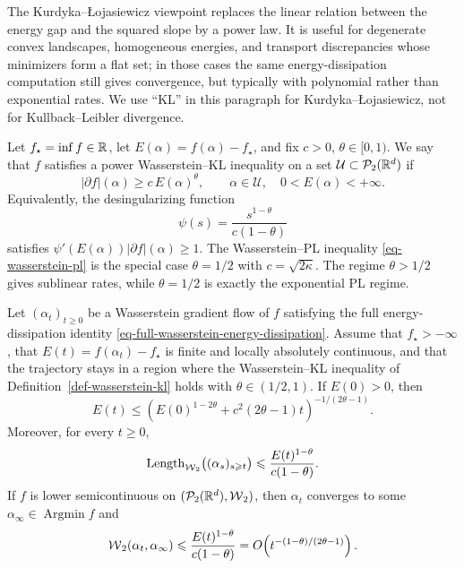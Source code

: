 The Kurdyka--{\L}ojasiewicz viewpoint replaces the linear relation between the energy gap and the squared slope by a power law. It is useful for degenerate convex landscapes, homogeneous energies, and transport discrepancies whose minimizers form a flat set; in those cases the same energy-dissipation computation still gives convergence, but typically with polynomial rather than exponential rates. We use ``KL'' in this paragraph for Kurdyka--{\L}ojasiewicz, not for Kullback--Leibler divergence.

\begin{defn}\label{def-wasserstein-kl}
	Let \(f_\star=\inf f\in\mathbb{R}\), let \(E(\alpha)=f(\alpha)-f_\star\), and fix \(c>0\), \(\theta\in[0,1)\). We say that \(f\) satisfies a power Wasserstein--KL inequality on a set \(\mathcal U\subset \mathcal{P}_2(\mathbb{R}^d)\) if
	\[
		|\partial f|(\alpha)
		\geq
		c\,E(\alpha)^\theta,
		\qquad
		\alpha\in\mathcal U,
		\quad
		0<E(\alpha)<+\infty.
	\]
	Equivalently, the desingularizing function
	\[
		\psi(s)=\frac{s^{1-\theta}}{c(1-\theta)}
	\]
	satisfies \(\psi'(E(\alpha))|\partial f|(\alpha)\geq 1\). The Wasserstein--PL inequality \eqref{eq-wasserstein-pl} is the special case \(\theta=1/2\) with \(c=\sqrt{2\kappa}\). The regime \(\theta>1/2\) gives sublinear rates, while \(\theta=1/2\) is exactly the exponential PL regime.
\end{defn}

\begin{thm}\label{thm-wasserstein-kl-sublinear}
	Let \((\alpha_t)_{t\geq0}\) be a Wasserstein gradient flow of \(f\) satisfying the full energy-dissipation identity \eqref{eq-full-wasserstein-energy-dissipation}. Assume that \(f_\star> -\infty\), that \(E(t)=f(\alpha_t)-f_\star\) is finite and locally absolutely continuous, and that the trajectory stays in a region where the Wasserstein--KL inequality of Definition~\ref{def-wasserstein-kl} holds with \(\theta\in(1/2,1)\). If \(E(0)>0\), then
	\[
		E(t)
		\leq
		\left(E(0)^{1-2\theta}+c^2(2\theta-1)t\right)^{-1/(2\theta-1)}.
	\]
	Moreover, for every \(t\geq0\),
	\[
		\operatorname{Length}_{\operatorname{\mathcal{W}}_2}\bigl((\alpha_s)_{s\geqslant t}\bigr)
		\leqslant
		\frac{E(t)^{1-\theta}}{c(1-\theta)}.
	\]
	If \(f\) is lower semicontinuous on \((\mathcal{P}_2(\mathbb{R}^d),\operatorname{\mathcal{W}}_2)\), then \(\alpha_t\) converges to some \(\alpha_\infty\in\operatorname{Argmin}f\) and
	\[
		\operatorname{\mathcal{W}}_2(\alpha_t,\alpha_\infty)
		\leqslant
		\frac{E(t)^{1-\theta}}{c(1-\theta)}
		=
		O\!\left(t^{-(1-\theta)/(2\theta-1)}\right).
	\]
\end{thm}

